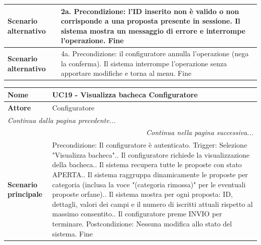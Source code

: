 \documentclass[12pt, a4paper, oneside]{report}
\begin{document}
\begin{tabularx}{\textwidth}{|l|X|}
    \textbf{Scenario alternativo} & 
    2a. Precondizione: l'ID inserito non è valido o non corrisponde a una proposta presente in sessione.\newline
    Il sistema mostra un messaggio di errore e interrompe l'operazione.\newline
    Fine \\ \hline

    \textbf{Scenario alternativo} & 
    4a. Precondizione: il configuratore annulla l'operazione (nega la conferma).\newline
    Il sistema interrompe l'operazione senza apportare modifiche e torna al menu.\newline
    Fine \\ \hline
\end{tabularx}

\begin{tabularx}{\textwidth}{|l|X|}
    \hline
    \textbf{Nome}               & \textbf{UC19 - Visualizza bacheca Configuratore} \\ \hline
    \textbf{Attore}             & Configuratore \\ \hline
    \endfirsthead 
    \hline
    \multicolumn{2}{|l|}{\textit{Continua dalla pagina precedente...}} \\ \hline
    \endhead 
    \hline
    \multicolumn{2}{|r|}{\textit{Continua nella pagina successiva...}} \\ \hline
    \endfoot 
    \hline
    \endlastfoot
    \textbf{Scenario principale} & 
    Precondizione: Il configuratore è autenticato.\newline
    Trigger: Selezione "Visualizza bacheca".\newline
    1. Il configuratore richiede la visualizzazione della bacheca.\newline
    2. Il sistema recupera tutte le proposte con stato APERTA.\newline
    3. Il sistema raggruppa dinamicamente le proposte per categoria (inclusa la voce "(categoria rimossa)" per le eventuali proposte orfane).\newline
    4. Il sistema mostra per ogni proposta: ID, dettagli, valori dei campi e il numero di iscritti attuali rispetto al massimo consentito.\newline
    5. Il configuratore preme INVIO per terminare.\newline
    Postcondizione: Nessuna modifica allo stato del sistema.\newline
    Fine \\ \hline

\end{tabularx}
\end{document}
